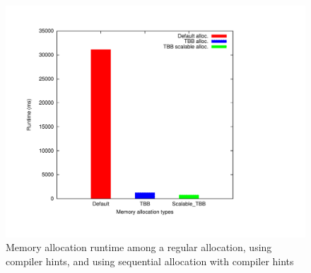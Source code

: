 \begin{figure}
	\centering
  	\includegraphics[scale=0.3]{../plots/mem_alloc/mem_alloc.pdf}
	\caption{Memory allocation runtime among a regular allocation, using compiler hints, and using sequential allocation with compiler hints}
	\label{fig:mem_alloc}
\end{figure}


